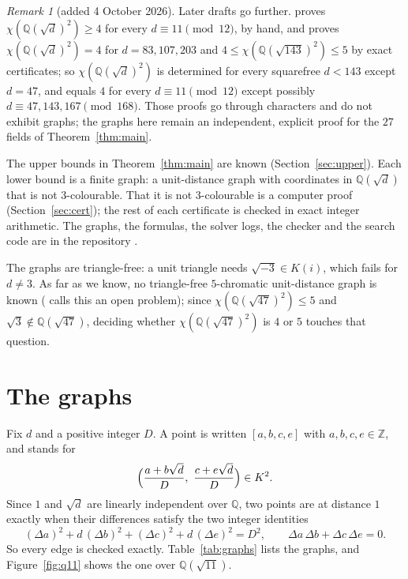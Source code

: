 \documentclass[11pt,a4paper]{amsart}
\theoremstyle{remark}
\newtheorem*{remark}{Remark}
\newcommand{\Q}{\mathbb{Q}}
\newcommand{\Z}{\mathbb{Z}}
\begin{document}
\begin{remark}[added 4 October 2026]
Later drafts go further. \cite{FC} proves $\chi(\Q(\sqrt d)^2)\ge4$ for every $d\equiv11\pmod{12}$, by hand, and
\cite{Winding} proves $\chi(\Q(\sqrt d)^2)=4$ for $d=83,107,203$ and $4\le\chi(\Q(\sqrt{143})^2)\le5$ by exact
certificates; so $\chi(\Q(\sqrt d)^2)$ is determined for every squarefree $d<143$ except $d=47$, and equals $4$ for
every $d\equiv11\pmod{12}$ except possibly $d\equiv47,143,167\pmod{168}$. Those proofs go through characters and
do not exhibit graphs; the graphs here remain an independent, explicit proof for the $27$ fields of
Theorem~\ref{thm:main}.
\end{remark}

The upper bounds in Theorem~\ref{thm:main} are known (Section~\ref{sec:upper}). Each lower bound is a finite
graph: a unit-distance graph with coordinates in $\Q(\sqrt d)$ that is not $3$-colourable. That it is not
$3$-colourable is a computer proof (Section~\ref{sec:cert}); the rest of each certificate is checked in exact
integer arithmetic. The graphs, the formulas, the solver logs, the checker and the search code are in the
repository \cite{Repo}.

The graphs are triangle-free: a unit triangle needs $\sqrt{-3}\in K(i)$, which fails for $d\neq3$. As far as
we know, no triangle-free $5$-chromatic unit-distance graph is known (\cite[\texttt{RESULTS.md}, \S0, item~3]{MM}
calls this an open problem);
since $\chi(\Q(\sqrt{47})^2)\le5$ and $\sqrt3\notin\Q(\sqrt{47})$, deciding whether $\chi(\Q(\sqrt{47})^2)$
is $4$ or $5$ touches that question.

\section{The graphs}\label{sec:graphs}

Fix $d$ and a positive integer $D$. A point is written $[a,b,c,e]$ with $a,b,c,e\in\Z$, and stands for
\[
  \Bigl(\frac{a+b\sqrt d}{D},\ \frac{c+e\sqrt d}{D}\Bigr)\in K^2.
\]
Since $1$ and $\sqrt d$ are linearly independent over $\Q$, two points are at distance $1$ exactly when their
differences satisfy the two integer identities
\begin{equation}\label{eq:unit}
  (\Delta a)^2+d\,(\Delta b)^2+(\Delta c)^2+d\,(\Delta e)^2=D^2,\qquad \Delta a\,\Delta b+\Delta c\,\Delta e=0 .
\end{equation}
So every edge is checked exactly. Table~\ref{tab:graphs} lists the graphs, and Figure~\ref{fig:q11} shows the
one over $\Q(\sqrt{11})$.
\end{document}
